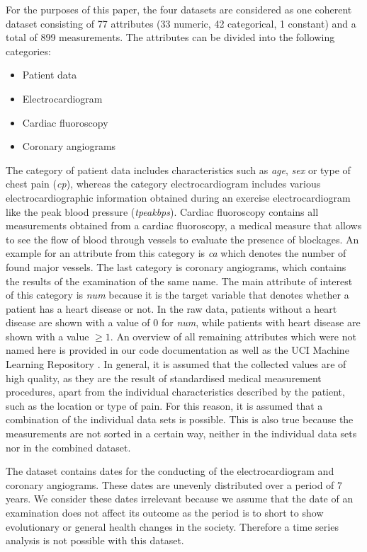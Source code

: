 For the purposes of this paper, the four datasets are considered as one coherent dataset consisting of 77 attributes (33 numeric, 42 categorical, 1 constant) and a total of 899 measurements.
The attributes can be divided into the following categories:
\begin{multicols}{2}
    \begin{itemize}
        \item Patient data
        \item Electrocardiogram
        \item Cardiac fluoroscopy
        \item Coronary angiograms
    \end{itemize}
\end{multicols}
The category of patient data includes characteristics such as \textit{age}, \textit{sex} or type of chest pain (\textit{cp}), whereas the category electrocardiogram includes various electrocardiographic information obtained during an exercise electrocardiogram like the peak blood pressure (\textit{tpeakbps}). Cardiac fluoroscopy contains all measurements obtained from a cardiac fluoroscopy, a medical measure that allows to see the flow of blood through vessels to evaluate the presence of blockages. An example for an attribute from this category is \textit{ca} which denotes the number of found major vessels. The last category is coronary angiograms, which contains the results of the examination of the same name. The main attribute of interest of this category is \textit{num} because it is the target variable that denotes whether a patient has a heart disease or not. In the raw data, patients without a heart disease are shown with a value of 0 for \textit{num}, while patients with heart disease are shown with a value  $\geq 1$.
An overview of all remaining attributes which were not named here is provided in our code documentation as well as the UCI Machine Learning Repository \citep{janosi1988}. In general, it is assumed that the collected values are of high quality, as they are the result of standardised medical measurement procedures, apart from the individual characteristics described by the patient, such as the location or type of pain. For this reason, it is assumed that a combination of the individual data sets is possible. This is also true because the measurements are not sorted in a certain way, neither in the individual data sets nor in the combined dataset.

The dataset contains dates for the conducting of the electrocardiogram and coronary angiograms. These dates are unevenly distributed over a period of 7 years. We consider these dates irrelevant because we assume that the date of an examination does not affect its outcome as the period is to short to show evolutionary or general health changes in the society. Therefore a time series analysis is not possible with this dataset.

